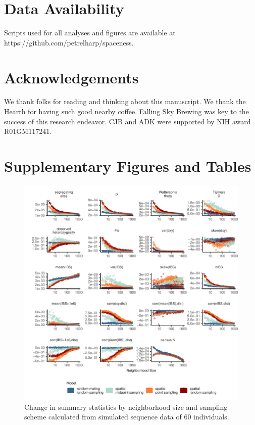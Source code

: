 \documentclass[11pt,twoside,lineno]{preprint}
\begin{document}
\section{Data Availability}
Scripts used for all analyses and figures are available at https://github.com/petrelharp/spaceness. 

\section{Acknowledgements}
We thank folks for reading and thinking about this manuscript. We thank the Hearth for having such good nearby coffee. Falling Sky Brewing was key to the success of this research endeavor. CJB and ADK were supported by NIH award R01GM117241. 





\section{Supplementary Figures and Tables}
\beginsupplement

\afterpage{\clearpage}
\begin{figure}[p]
\centering
\includegraphics[width=\textwidth]{figures/sumstats_by_neighbors_allstats.pdf}
\caption{Change in summary statistics by neighborhood size and sampling scheme calculated from simulated sequence data of 60 individuals.}
\label{fig:allsumstats} 
\end{figure}
\end{document}
